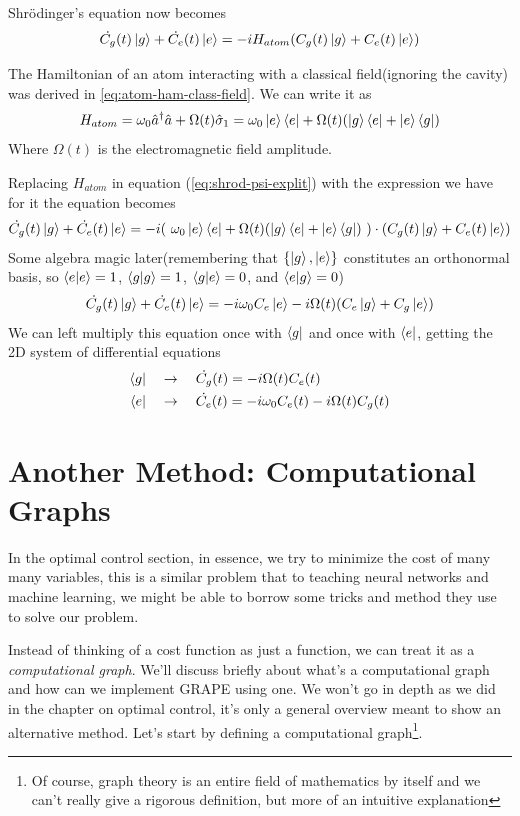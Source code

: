 \documentclass[english, a4paper, 12pt, twoside]{article}
\numberwithin{equation}{section} %
\begin{document}
Shr\"{o}dinger's equation now becomes
\begin{equation} \label{eq:shrod-psi-explit}
     \dot{C_g}(t) \ket{g} + \dot{C_e}(t) \ket{e} = -i H_{atom} (C_g(t) \ket{g} + C_e(t) \ket{e})
\end{equation}

The Hamiltonian of an atom interacting with a classical field(ignoring the cavity) was derived in \ref{eq:atom-ham-class-field}. We can write it as
\[
    H_{atom} = \omega_0 \hat{a}^\dag \hat{a} + \Omega(t)\hat{\sigma}_1= \omega_0\ket{e}\bra{e} + \Omega(t)(\ket{g}\bra{e} + \ket{e}\bra{g})
\]
Where $\Omega(t)$ is the electromagnetic field amplitude.

Replacing $H_{atom}$ in equation (\ref{eq:shrod-psi-explit}) with the expression we have for it the equation becomes
\[
    \dot{C_g}(t) \ket{g} + \dot{C_e}(t) \ket{e} = -i (\ \omega_0\ket{e}\bra{e} + \Omega(t)(\ket{g}\bra{e} + \ket{e}\bra{g})\ )\cdot (C_g(t) \ket{g} + C_e(t) \ket{e})
\]
Some algebra magic later(remembering that $\{\ket{g},\ket{e}\}$ constitutes an orthonormal basis, so $\braket{e}{e} = 1$, $\braket{g}{g} = 1$, $\braket{g}{e} = 0$, and $\braket{e}{g} = 0$)
\[
    \dot{C_g}(t) \ket{g} + \dot{C_e}(t) \ket{e} = -i \omega_0 C_e \ket{e} - i\Omega(t)(C_e\ket{g} + C_g \ket{e})
\]
We can left multiply this equation once with $\bra{g}$ and once with $\bra{e}$, getting the 2D system of differential equations
\begin{align*}
    \bra{g} \quad &\rightarrow \quad \dot{C_g}(t) = -i \Omega(t)C_e(t) \\
    \bra{e} \quad &\rightarrow \quad \dot{C_e}(t) = -i \omega_0 C_e(t) - i\Omega(t) C_g(t)
\end{align*} %




\newpage
\section{Another Method: Computational Graphs}
In the optimal control section, in essence, we try to minimize the cost of many many variables, this is a similar problem that to teaching neural networks and machine learning, we might be able to borrow some tricks and method they use to solve our problem.

Instead of thinking of a cost function as just a function, we can treat it as a \textit{computational graph}. We'll discuss briefly about what's a computational graph and how can we implement GRAPE using one. We won't go in depth as we did in the chapter on optimal control, it's only a general overview meant to show an alternative method. Let's start by defining a computational graph\footnote{Of course, graph theory is an entire field of mathematics by itself and we can't really give a rigorous definition, but more of an intuitive explanation}.
\end{document}
